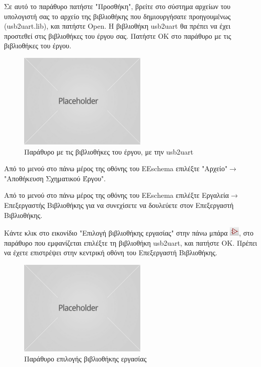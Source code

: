 \documentclass[a4paper]{article}
\begin{document}
Σε αυτό το παράθυρο πατήστε "Προσθήκη", βρείτε στο σύστημα αρχείων του υπολογιστή σας το αρχείο της βιβλιοθήκης που δημιουργήσατε προηγουμένως (usb2uart.lib), και πατήστε Open. Η βιβλιοθήκη usb2uart θα πρέπει να έχει προστεθεί στις βιβλιοθήκες του έργου σας. Πατήστε ΟΚ στο παράθυρο με τις βιβλιοθήκες του έργου.

\begin{figure}
  \begin{center}
    \includegraphics{img/kicad-main.png}
    \caption{Παράθυρο με τις βιβλιοθήκες του έργου, με την usb2uart}
    \label{fig:kicad-main}
  \end{center}
\end{figure}

Από το μενού στο πάνω μέρος της οθόνης του EEschema επιλέξτε "Αρχείο"$\rightarrow$"Αποθήκευση Σχηματικού Έργου".

Από το μενού στο πάνω μέρος της οθόνης του EEschema επιλέξτε Εργαλεία$\rightarrow$Επεξεργαστής Βιβλιοθήκης για να συνεχίσετε να δουλεύετε στον Επεξεργαστή Βιβλιοθήκης.

Κάντε κλικ στο εικονίδιο "Επιλογή βιβλιοθήκης εργασίας" στην πάνω μπάρα \includegraphics{img/graphic.png}, στο παράθυρο που εμφανίζεται επιλέξτε τη βιβλιοθήκη usb2uart, και πατήστε ΟΚ. Πρέπει να έχετε επιστρέψει στην κεντρική οθόνη του Επεξεργαστή Βιβλιοθήκης.

\begin{figure}
  \begin{center}
    \includegraphics{img/kicad-main.png}
    \caption{Παράθυρο επιλογής βιβλιοθήκης εργασίας}
    \label{fig:kicad-main}
  \end{center}
\end{figure}
\end{document}
